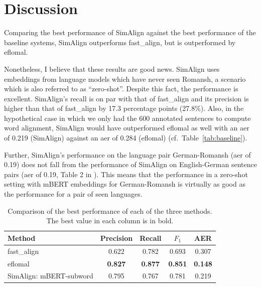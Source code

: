 \section{Discussion}\label{sec:discussion}
Comparing the best performance of SimAlign against the best performance of the baseline systems, SimAlign outperforms fast\_align, but is outperformed by eflomal.

Nonetheless, I believe that these results are good news. 
SimAlign uses embeddings from language models which have never seen Romansh, a scenario which is also referred to as \enquote{zero-shot}. 
Despite this fact, the performance is excellent. 
SimAlign's recall is on par with that of fast\_align and its precision is higher than that of fast\_align by 17.3 percentage points (27.8\%).
Also, in the hypothetical case in which we only had the 600 annotated sentences to compute word alignment, SimAlign would have outperformed eflomal as well with an \acrshort{aer} of 0.219  (SimAlign) against an \acrshort{aer} of 0.284 (eflomal) (cf.~Table~\ref{tab:baseline}). 

Further,  SimAlign's performance on the language pair German-Romansh (\acrshort{aer} of 0.19) does not fall from the performance of SimAlign on English-German sentence pairs (\acrshort{aer} of 0.19, Table 2 in \cite{jalili-sabet-etal-2020-simalign}). This means that the performance in a zero-shot setting  with mBERT embeddings  for German-Romansh is virtually as good as the performance for a pair of seen languages.

\begin{table}
\centering
\begin{tabular}{lcccc}
	\toprule
							Method & Precision & Recall & $F_1$ & AER \\
\midrule
  fast\_align& 0.622	  & 0.782  & 0.693 & 0.307 \\

							eflomal     & \textbf{0.827} & \textbf{0.877} & \textbf{0.851} & \textbf{0.148} \\

SimAlign:                     mBERT-subword & 0.795   & 0.767  & 0.781  & 0.219 \\
\bottomrule
\end{tabular}
\caption[Comparison of the best performance of the three SimAlign methods]{Comparison of the best performance of each of the three methods. 
The best value in each column is in bold.}
\label{tab:comparison}
\end{table}

